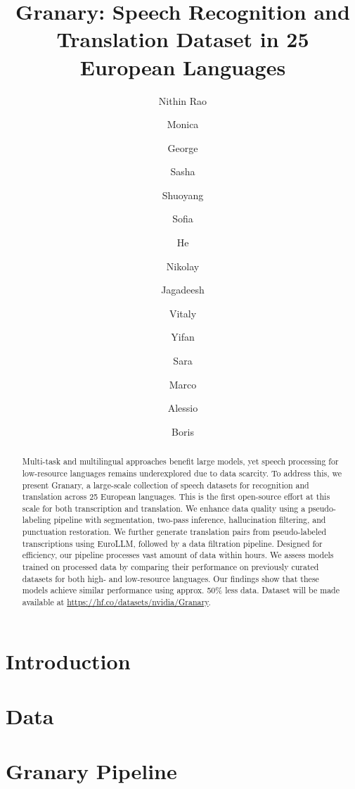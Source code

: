 \documentclass{Interspeech}
\title{Granary: Speech Recognition and Translation Dataset in 25 European Languages}
\author[affiliation={1}]{Nithin Rao}{Koluguri$^{\dagger*}$}
\author[affiliation={2}]{Monica}{Sekoyan$^{*}$}
\author[affiliation={2}]{George}{Zelenfroynd$^{*}$}
\author[affiliation={3}]{Sasha}{Meister$^{*}$}
\author[affiliation={1}]{Shuoyang}{Ding$^{*}$}
\author[affiliation={2}]{Sofia}{Kostandian}
\author[affiliation={1}]{He}{Huang}
\author[affiliation={2}]{Nikolay}{Karpov$^{\#}$}
\author[affiliation={1}]{Jagadeesh}{Balam}
\author[affiliation={1}]{Vitaly}{Lavrukhin}
\author[affiliation={4}]{Yifan}{Peng}
\author[affiliation={5}]{Sara}{Papi}
\author[affiliation={5}]{Marco}{Gaido}
\author[affiliation={5}]{Alessio}{Brutti}
\author[affiliation={1}]{Boris}{Ginsburg}
\affiliation{}{NVIDIA}{USA}
\affiliation{}{NVIDIA}{Armenia}
\affiliation{}{NVIDIA}{Germany}
\affiliation{}{Carnegie Mellon University}{USA}
\affiliation{}{Fondazione Bruno Kessler (FBK)}{Italy}
\begin{document}
\maketitle
{}

\begin{abstract}
Multi-task and multilingual approaches benefit large models, yet speech processing for low-resource languages remains underexplored due to data scarcity. To address this, we present Granary, a large-scale collection of speech datasets for recognition and translation across 25 European languages. This is the first open-source effort at this scale for both transcription and translation. We enhance data quality using a pseudo-labeling pipeline with segmentation, two-pass inference, hallucination filtering, and punctuation restoration. We further generate translation pairs from pseudo-labeled transcriptions using EuroLLM, followed by a data filtration pipeline. Designed for efficiency, our pipeline processes vast amount of data within hours.  We assess models trained on processed data by comparing their performance on previously curated datasets for both high- and low-resource languages. Our findings show that these models achieve similar performance using approx. 50\% less data. Dataset will be made available at \url{https://hf.co/datasets/nvidia/Granary}.


\end{abstract}

\section{Introduction}


\section{Data}



\section{Granary Pipeline}


\end{document}
